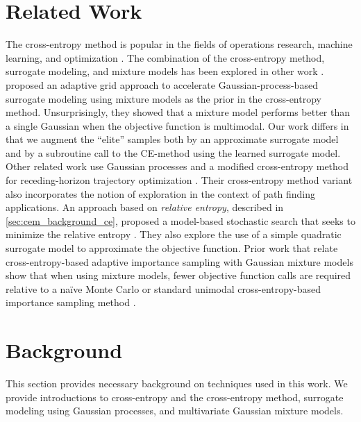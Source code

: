 \section{Related Work} \label{sec:cem_related_work}
The cross-entropy method is popular in the fields of operations research, machine learning, and optimization \cite{kochenderfer2015decision,kochenderfer2019algorithms}.
The combination of the cross-entropy method, surrogate modeling, and mixture models has been explored in other work \cite{bardenet2010surrogating}. 
 proposed an adaptive grid approach to accelerate Gaussian-process-based surrogate modeling using mixture models as the prior in the cross-entropy method. Unsurprisingly, they showed that a mixture model performs better than a single Gaussian when the objective function is multimodal.
Our work differs in that we augment the ``elite'' samples both by an approximate surrogate model and by a subroutine call to the CE-method using the learned surrogate model.
Other related work use Gaussian processes and a modified cross-entropy method for receding-horizon trajectory optimization \cite{tan2018gaussian}.
Their cross-entropy method variant also incorporates the notion of exploration in the context of path finding applications.
An approach based on \textit{relative entropy}, described in \cref{sec:cem_background_ce}, proposed a model-based stochastic search that seeks to minimize the relative entropy \cite{NIPS2015_5672}. They also explore the use of a simple quadratic surrogate model to approximate the objective function.
Prior work that relate cross-entropy-based adaptive importance sampling with Gaussian mixture models show that when using mixture models, fewer objective function calls are required relative to a na\"ive Monte Carlo or standard unimodal cross-entropy-based importance sampling method \cite{kurtz2013cross,wang2016cross}.


\section{Background} \label{sec:cem_background}
This section provides necessary background on techniques used in this work. We provide introductions to cross-entropy and the cross-entropy method, surrogate modeling using Gaussian processes, and multivariate Gaussian mixture models.

